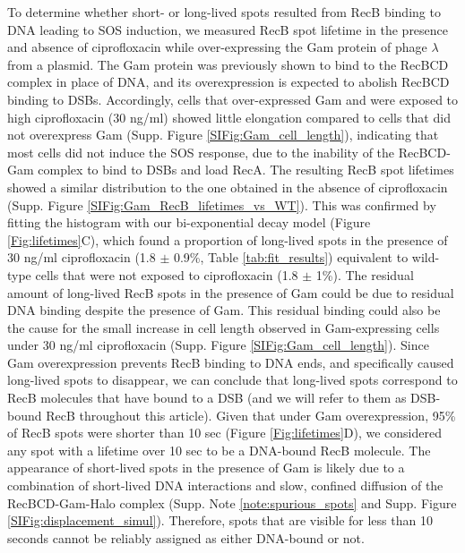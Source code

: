 To determine whether short- or long-lived spots resulted from RecB binding to DNA leading to SOS induction, we measured RecB spot lifetime in the presence and absence of ciprofloxacin while over-expressing the Gam protein of phage $\lambda$ from a plasmid. The Gam protein was previously shown to bind to the RecBCD complex in place of DNA\cite{Wilkinson2016}, and its overexpression is expected to abolish RecBCD binding to DSBs. Accordingly, cells that over-expressed Gam and were exposed to high ciprofloxacin (30 ng/ml) showed little elongation compared to cells that did not overexpress Gam (Supp. Figure \ref{SIFig:Gam_cell_length}), indicating that most cells did not induce the SOS response, due to the inability of the RecBCD-Gam complex to bind to DSBs and load RecA. The resulting RecB spot lifetimes showed a similar distribution to the one obtained in the absence of ciprofloxacin (Supp. Figure \ref{SIFig:Gam_RecB_lifetimes_vs_WT}). This was confirmed by fitting the histogram with our bi-exponential decay model (Figure \ref{Fig:lifetimes}C), which found a proportion of long-lived spots in the presence of 30 ng/ml ciprofloxacin (1.8 $\pm$ 0.9\%, Table \ref{tab:fit_results}) equivalent to wild-type cells that were not exposed to ciprofloxacin (1.8 $\pm$ 1\%). The residual amount of long-lived RecB spots in the presence of Gam could be due to residual DNA binding despite the presence of Gam. This residual binding could also be the cause for the small increase in cell length observed in Gam-expressing cells under 30 ng/ml ciprofloxacin (Supp. Figure \ref{SIFig:Gam_cell_length}). Since Gam overexpression prevents RecB binding to DNA ends, and specifically caused long-lived spots to disappear, we can conclude that long-lived spots correspond to RecB molecules that have bound to a DSB (and we will refer to them as DSB-bound RecB throughout this article). Given that under Gam overexpression, 95\% of RecB spots were shorter than 10 sec (Figure \ref{Fig:lifetimes}D), we considered any spot with a lifetime over 10 sec to be a DNA-bound RecB molecule. The appearance of short-lived spots in the presence of Gam is likely due to a combination of short-lived DNA interactions and slow, confined diffusion of the RecBCD-Gam-Halo complex (Supp. Note \ref{note:spurious_spots} and Supp. Figure \ref{SIFig:displacement_simul}). Therefore, spots that are visible for less than 10 seconds cannot be reliably assigned as either DNA-bound or not.

